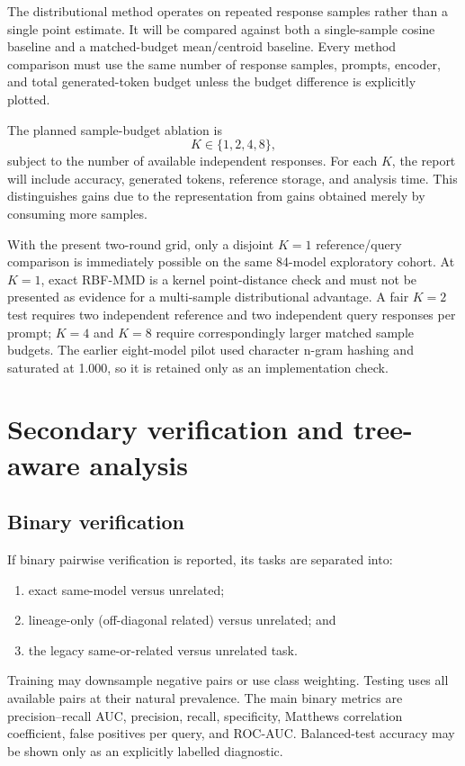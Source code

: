 \documentclass[11pt,a4paper]{article}
\begin{document}
The distributional method operates on repeated response samples rather than a
single point estimate. It will be compared against both a single-sample cosine
baseline and a matched-budget mean/centroid baseline. Every method comparison
must use the same number of response samples, prompts, encoder, and total
generated-token budget unless the budget difference is explicitly plotted.

The planned sample-budget ablation is
\[
  K\in\{1,2,4,8\},
\]
subject to the number of available independent responses. For each $K$, the
report will include accuracy, generated tokens, reference storage, and analysis
time. This distinguishes gains due to the representation from gains obtained
merely by consuming more samples.

With the present two-round grid, only a disjoint $K=1$ reference/query
comparison is immediately possible on the same 84-model exploratory cohort.
At $K=1$, exact RBF-MMD is a kernel point-distance check and must not be
presented as evidence for a multi-sample distributional advantage. A fair
$K=2$ test requires two independent reference and two independent query
responses per prompt; $K=4$ and $K=8$ require correspondingly larger matched
sample budgets. The earlier eight-model pilot used character n-gram hashing
and saturated at 1.000, so it is retained only as an implementation check.

\section{Secondary verification and tree-aware analysis}

\subsection{Binary verification}

If binary pairwise verification is reported, its tasks are separated into:

\begin{enumerate}
  \item exact same-model versus unrelated;
  \item lineage-only (off-diagonal related) versus unrelated; and
  \item the legacy same-or-related versus unrelated task.
\end{enumerate}

Training may downsample negative pairs or use class weighting. Testing uses all
available pairs at their natural prevalence. The main binary metrics are
precision--recall AUC, precision, recall, specificity, Matthews correlation
coefficient, false positives per query, and ROC-AUC. Balanced-test accuracy may
be shown only as an explicitly labelled diagnostic.
\end{document}
